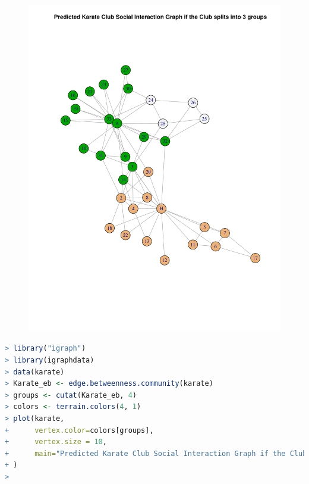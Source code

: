 \documentclass[a4paper, 11pt]{article}
\begin{document}
\begin{figure}[H]
\centering
\includegraphics[scale=0.7]{3.pdf}
\end{figure}

\pagebreak

\begin{lstlisting}[language=R, breakatwhitespace=〈false), label=Predicted Karate Club Social Interaction Graph if the Club splits into 4 groups in R, caption= Predicted Karate Club Social Interaction Graph if the Club splits into 4 groups in R]
> library("igraph")
> library(igraphdata)
> data(karate)
> Karate_eb <- edge.betweenness.community(karate)
> groups <- cutat(Karate_eb, 4)
> colors <- terrain.colors(4, 1)
> plot(karate, 
+      vertex.color=colors[groups],
+      vertex.size = 10,
+      main="Predicted Karate Club Social Interaction Graph if the Club splits into 4 groups"
+ )
>
\end{lstlisting}
\end{document}
